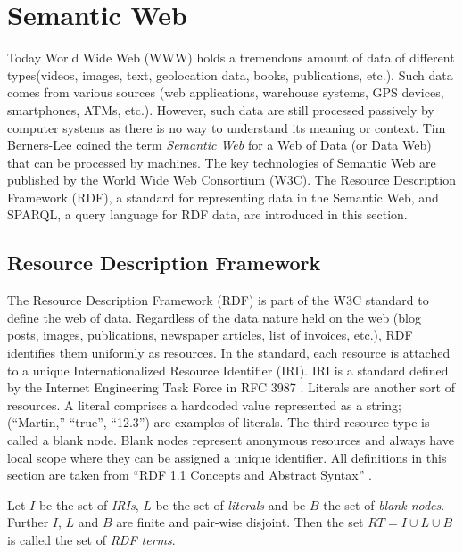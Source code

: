 \section{Semantic Web}
\label{sec:preliminaries:semanticweb}

Today World Wide Web (WWW) holds a tremendous amount of data of different types(videos,
images, text, geolocation data, books, publications, etc.). Such data comes from various sources
(web applications, warehouse systems, GPS devices, smartphones, ATMs, etc.). However, such
data are still processed passively by computer systems as there is no way to understand its meaning or context.
Tim Berners-Lee coined the term \textit{Semantic Web} for a Web of Data (or Data Web) \cite{LeeWeavingTheWeb} that can be processed by machines.   
The key technologies of Semantic Web are published by the World Wide Web Consortium (W3C). 
The Resource Description Framework (RDF), a standard for representing data in the Semantic Web, and SPARQL, a query language for RDF data, are introduced in this section.

\subsection{Resource Description Framework}
\label{sec:rdf}
The Resource Description Framework (RDF) \cite{rdfonline} is part of the W3C standard to define the web of data. Regardless of the data nature held on the web (blog posts, images, publications, newspaper articles,  list of invoices, etc.), RDF identifies them uniformly as resources. In the standard, each resource is attached to a unique Internationalized Resource Identifier (IRI). IRI is a standard defined by the Internet Engineering Task Force in RFC 3987 \cite{rfc3987}. Literals are another sort of resources. A literal comprises a hardcoded value represented as a string; (“Martin,” “true”, “12.3”) are examples of literals. The third resource type is called a blank node. Blank nodes represent anonymous resources and always have local scope where they can be assigned a unique identifier. All definitions in this section are taken from “RDF 1.1 Concepts and Abstract Syntax” \cite{RDF11}. \\

\begin{definition}
Let $I$ be the set of \textit{IRIs}, $L$ be the set of \textit{literals} and be $B$ the set of
\textit{blank nodes}. Further $I$, $L$ and $B$ are finite and pair-wise disjoint. Then the set $RT = I \cup L \cup B$ is called the set of \textit{RDF terms}. 
\end{definition}

